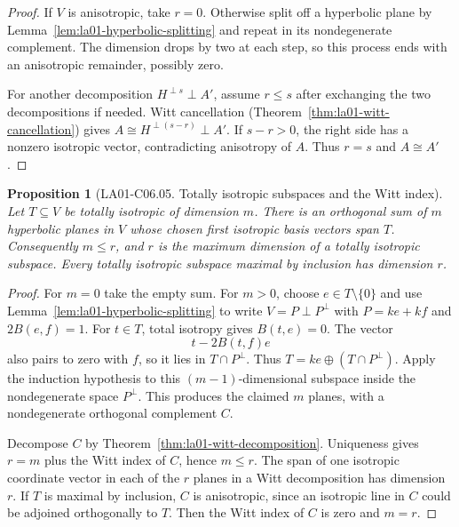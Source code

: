 \documentclass[11pt,oneside,openany]{book}
\newtheorem{proposition}[theorem]{Proposition}
\theoremstyle{definition}
\theoremstyle{remark}
\begin{document}
\begin{proof}
If \(V\) is anisotropic, take \(r=0\). Otherwise split off a
hyperbolic plane by Lemma~\ref{lem:la01-hyperbolic-splitting} and
repeat in its nondegenerate complement. The dimension drops by
two at each step, so this process ends with an anisotropic
remainder, possibly zero.

For another decomposition \(H^{\perp s}\perp A'\), assume
\(r\le s\) after exchanging the two decompositions if needed.
Witt cancellation (Theorem~\ref{thm:la01-witt-cancellation})
gives \(A\cong H^{\perp(s-r)}\perp A'\). If \(s-r>0\), the
right side has a nonzero isotropic vector, contradicting
anisotropy of \(A\). Thus \(r=s\) and \(A\cong A'\).
\end{proof}

\begin{proposition}[LA01-C06.05. Totally isotropic subspaces and the Witt index]
\label{prop:la01-witt-index}
Let \(T\subseteq V\) be totally isotropic of dimension \(m\).
There is an orthogonal sum of \(m\) hyperbolic planes in \(V\)
whose chosen first isotropic basis vectors span \(T\).
Consequently \(m\le r\), and \(r\) is the maximum dimension of a
totally isotropic subspace. Every totally isotropic subspace
maximal by inclusion has dimension \(r\).
\end{proposition}

\begin{proof}
For \(m=0\) take the empty sum. For \(m>0\), choose
\(e\in T\setminus\{0\}\) and use
Lemma~\ref{lem:la01-hyperbolic-splitting} to write
\(V=P\perp P^\perp\) with \(P=ke+kf\) and \(2B(e,f)=1\).
For \(t\in T\), total isotropy gives \(B(t,e)=0\). The vector
\[
  t-2B(t,f)e
\]
also pairs to zero with \(f\), so it lies in \(T\cap P^\perp\).
Thus \(T=ke\oplus(T\cap P^\perp)\). Apply the induction
hypothesis to this \((m-1)\)-dimensional subspace inside the
nondegenerate space \(P^\perp\). This produces the claimed \(m\)
planes, with a nondegenerate orthogonal complement \(C\).

Decompose \(C\) by Theorem~\ref{thm:la01-witt-decomposition}.
Uniqueness gives \(r=m\) plus the Witt index of \(C\), hence
\(m\le r\). The span of one isotropic coordinate vector in each
of the \(r\) planes in a Witt decomposition has dimension \(r\).
If \(T\) is maximal by inclusion, \(C\) is anisotropic, since an
isotropic line in \(C\) could be adjoined orthogonally to \(T\).
Then the Witt index of \(C\) is zero and \(m=r\).
\end{proof}
\end{document}
